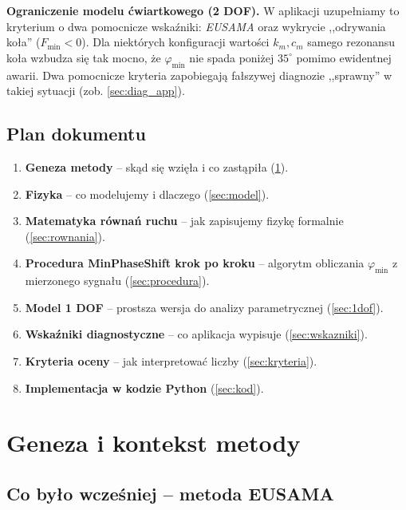 \documentclass[11pt,a4paper]{article}
\theoremstyle{plainpol}
\begin{document}
\begin{uwagabox}
\textbf{Ograniczenie modelu ćwiartkowego (2 DOF).} W aplikacji uzupełniamy
to kryterium o dwa pomocnicze wskaźniki: \emph{EUSAMA} oraz wykrycie
,,odrywania koła'' ($F_{\min}<0$). Dla niektórych konfiguracji wartości
$k_m, c_m$ samego rezonansu koła wzbudza się tak mocno, że $\varphi_{\min}$
nie spada poniżej $35^\circ$ pomimo ewidentnej awarii. Dwa pomocnicze
kryteria zapobiegają fałszywej diagnozie ,,sprawny'' w takiej sytuacji
(zob. \cref{sec:diag_app}).
\end{uwagabox}

\subsection{Plan dokumentu}

\begin{enumerate}
  \item \textbf{Geneza metody} -- skąd się wzięła i co zastąpiła
    (\cref{sec:geneza}).
  \item \textbf{Fizyka} -- co modelujemy i dlaczego (\cref{sec:model}).
  \item \textbf{Matematyka równań ruchu} -- jak zapisujemy fizykę
    formalnie (\cref{sec:rownania}).
  \item \textbf{Procedura MinPhaseShift krok po kroku} -- algorytm
    obliczania $\varphi_{\min}$ z mierzonego sygnału (\cref{sec:procedura}).
  \item \textbf{Model 1 DOF} -- prostsza wersja do analizy parametrycznej
    (\cref{sec:1dof}).
  \item \textbf{Wskaźniki diagnostyczne} -- co aplikacja wypisuje
    (\cref{sec:wskazniki}).
  \item \textbf{Kryteria oceny} -- jak interpretować liczby
    (\cref{sec:kryteria}).
  \item \textbf{Implementacja w kodzie Python} (\cref{sec:kod}).
\end{enumerate}

\section{Geneza i kontekst metody}\label{sec:geneza}

\subsection{Co było wcześniej -- metoda EUSAMA}
\end{document}
